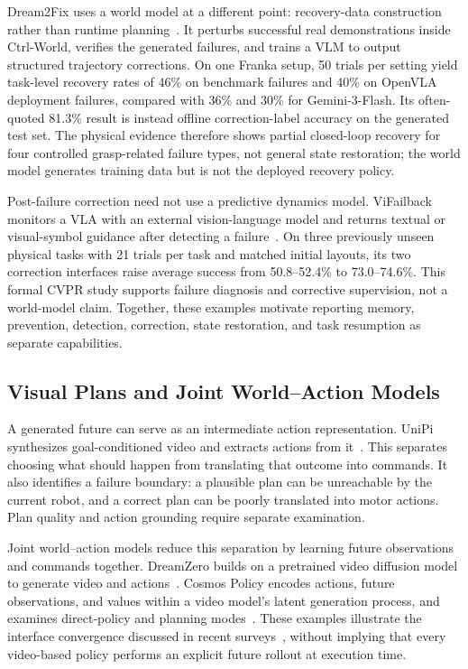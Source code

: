 Dream2Fix uses a world model at a different point: recovery-data construction rather than runtime planning~\cite{li2026dream2fix}. It perturbs successful real demonstrations inside Ctrl-World, verifies the generated failures, and trains a VLM to output structured trajectory corrections. On one Franka setup, 50 trials per setting yield task-level recovery rates of 46\% on benchmark failures and 40\% on OpenVLA deployment failures, compared with 36\% and 30\% for Gemini-3-Flash. Its often-quoted 81.3\% result is instead offline correction-label accuracy on the generated test set. The physical evidence therefore shows partial closed-loop recovery for four controlled grasp-related failure types, not general state restoration; the world model generates training data but is not the deployed recovery policy.

Post-failure correction need not use a predictive dynamics model. ViFailback monitors a VLA with an external vision-language model and returns textual or visual-symbol guidance after detecting a failure~\cite{zeng2026vifailback}. On three previously unseen physical tasks with 21 trials per task and matched initial layouts, its two correction interfaces raise average success from 50.8--52.4\% to 73.0--74.6\%. This formal CVPR study supports failure diagnosis and corrective supervision, not a world-model claim. Together, these examples motivate reporting memory, prevention, detection, correction, state restoration, and task resumption as separate capabilities.

\subsection{Visual Plans and Joint World--Action Models}
A generated future can serve as an intermediate action representation. UniPi synthesizes goal-conditioned video and extracts actions from it~\cite{du2023unipi}. This separates choosing what should happen from translating that outcome into commands. It also identifies a failure boundary: a plausible plan can be unreachable by the current robot, and a correct plan can be poorly translated into motor actions. Plan quality and action grounding require separate examination.

Joint world--action models reduce this separation by learning future observations and commands together. DreamZero builds on a pretrained video diffusion model to generate video and actions~\cite{ye2026dreamzero}. Cosmos Policy encodes actions, future observations, and values within a video model's latent generation process, and examines direct-policy and planning modes~\cite{kim2026cosmospolicy}. These examples illustrate the interface convergence discussed in recent surveys~\cite{hou2026survey,lu2026survey}, without implying that every video-based policy performs an explicit future rollout at execution time.

